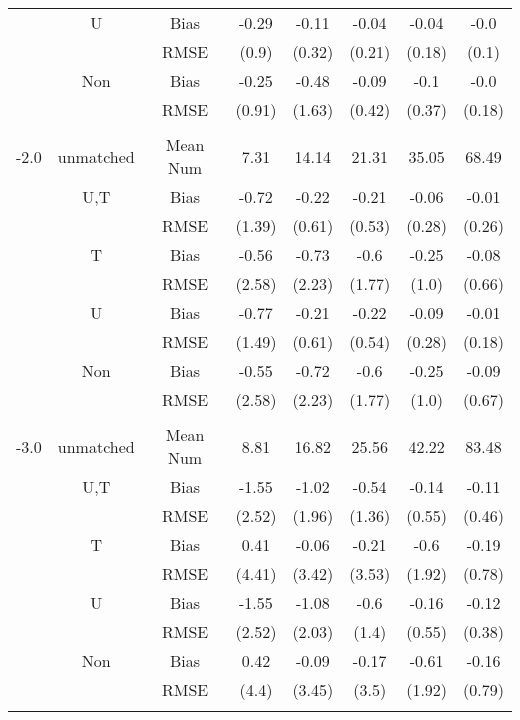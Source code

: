 \begin{tabular}{@{\extracolsep{5pt}}lc|cccccc}
 & U & Bias & -0.29 & -0.11 & -0.04 & -0.04 & -0.0 \\
 &  & RMSE & (0.9) & (0.32) & (0.21) & (0.18) & (0.1) \\
 & Non & Bias & -0.25 & -0.48 & -0.09 & -0.1 & -0.0 \\
 &  & RMSE & (0.91) & (1.63) & (0.42) & (0.37) & (0.18) \\
 &  &  &  &  &  &  &  \\
-2.0 & unmatched & Mean Num & 7.31 & 14.14 & 21.31 & 35.05 & 68.49 \\
 & U,T & Bias & -0.72 & -0.22 & -0.21 & -0.06 & -0.01 \\
 &  & RMSE & (1.39) & (0.61) & (0.53) & (0.28) & (0.26) \\
 & T & Bias & -0.56 & -0.73 & -0.6 & -0.25 & -0.08 \\
 &  & RMSE & (2.58) & (2.23) & (1.77) & (1.0) & (0.66) \\
 & U & Bias & -0.77 & -0.21 & -0.22 & -0.09 & -0.01 \\
 &  & RMSE & (1.49) & (0.61) & (0.54) & (0.28) & (0.18) \\
 & Non & Bias & -0.55 & -0.72 & -0.6 & -0.25 & -0.09 \\
 &  & RMSE & (2.58) & (2.23) & (1.77) & (1.0) & (0.67) \\
 &  &  &  &  &  &  &  \\
-3.0 & unmatched & Mean Num & 8.81 & 16.82 & 25.56 & 42.22 & 83.48 \\
 & U,T & Bias & -1.55 & -1.02 & -0.54 & -0.14 & -0.11 \\
 &  & RMSE & (2.52) & (1.96) & (1.36) & (0.55) & (0.46) \\
 & T & Bias & 0.41 & -0.06 & -0.21 & -0.6 & -0.19 \\
 &  & RMSE & (4.41) & (3.42) & (3.53) & (1.92) & (0.78) \\
 & U & Bias & -1.55 & -1.08 & -0.6 & -0.16 & -0.12 \\
 &  & RMSE & (2.52) & (2.03) & (1.4) & (0.55) & (0.38) \\
 & Non & Bias & 0.42 & -0.09 & -0.17 & -0.61 & -0.16 \\
 &  & RMSE & (4.4) & (3.45) & (3.5) & (1.92) & (0.79) \\
 &  &  &  &  &  &  &  \\
\hline 
\bottomrule 
\end{tabular}
